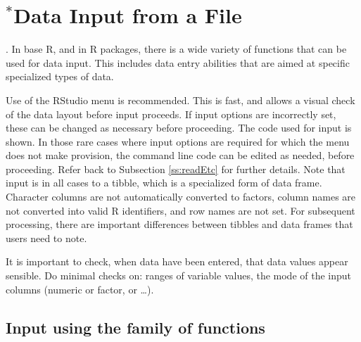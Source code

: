 






\section{$^*$Data Input from a File}\label{sec:entry}

.
In base R, and in R packages, there is a wide variety of functions that
can be used for data input.  This includes data entry abilities that are
aimed at specific specialized types of data.

Use of the RStudio menu is recommended.  This is fast, and allows
a visual check of the data layout before input proceeds.  If input
options are incorrectly set, these can be changed as necessary
before proceeding. The code used for input is shown. In those rare
cases where input options are required for which the menu does not 
make provision, the command line code can be edited as needed,
before proceeding.  Refer back to Subsection \ref{ss:readEtc} for 
further details.  Note that input is in all cases to a tibble, 
which is a specialized form of data frame. 
Character columns are not automatically converted to factors,
column names are not converted into valid R identifiers, and row
names are not set.  For subsequent processing, there are
important differences between tibbles and data frames that users
need to note.

It is important to check, when data have been entered,
that data values appear sensible.  Do minimal checks on: ranges
  of variable values, the mode of the input columns (numeric or
  factor, or \ldots). 

\subsection{Input using the  family of functions}

